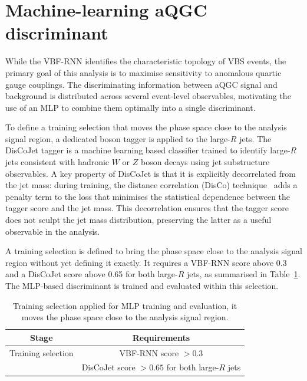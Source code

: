 \section{Machine-learning aQGC discriminant}
\label{sec:mldiscriminant}

While the VBF-RNN identifies the characteristic topology of VBS events, the primary goal of this analysis is to maximise sensitivity to anomalous quartic gauge couplings. The discriminating information between aQGC signal and background is distributed across several event-level observables, motivating the use of an MLP to combine them optimally into a single discriminant.

To define a training selection that moves the phase space close to the analysis signal region, a dedicated boson tagger is applied to the large-$R$ jets. The DisCoJet tagger is a machine learning based classifier trained to identify large-$R$ jets consistent with hadronic $W$ or $Z$ boson decays using jet substructure observables. A key property of DisCoJet is that it is explicitly decorrelated from the jet mass: during training, the distance correlation (DisCo) technique~\cite{Kasieczka:2020DisCo} adds a penalty term to the loss that minimises the statistical dependence between the tagger score and the jet mass. This decorrelation ensures that the tagger score does not sculpt the jet mass distribution, preserving the latter as a useful observable in the analysis.

A training selection is defined to bring the phase space close to the analysis signal region without yet defining it exactly. It requires a VBF-RNN score above 0.3 and a DisCoJet score above 0.65 for both large-$R$ jets, as summarised in Table~\ref{tab:mlp_selection}. The MLP-based discriminant is trained and evaluated within this selection.

\begin{table}[htbp]
  \centering
  \caption{Training selection applied for MLP training and evaluation, it moves the phase space close to the analysis signal region.}
  \label{tab:mlp_selection}
  \begin{tabular}{|c|c|}
    \hline
    \textbf{Stage} & \textbf{Requirements} \\
    \hline
    Training selection & VBF-RNN score $> 0.3$\\
                            & DisCoJet score $> 0.65$ for both large-$R$ jets \\
    \hline
  \end{tabular}
\end{table}

